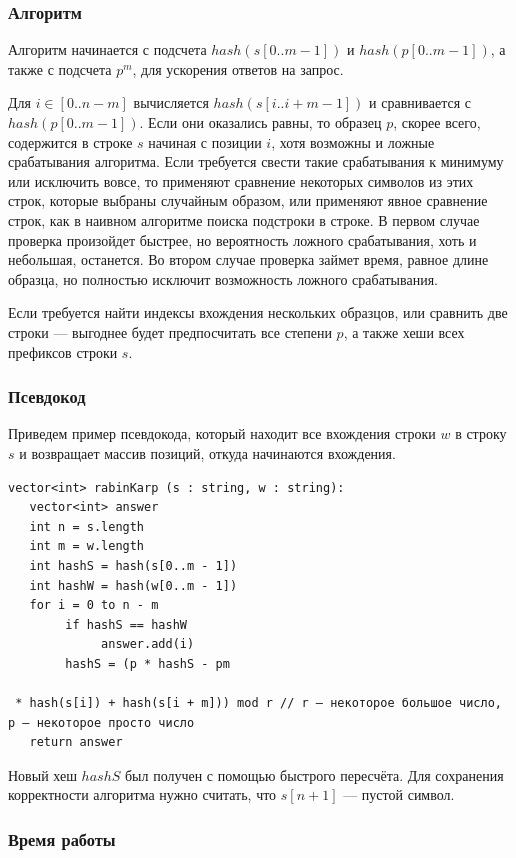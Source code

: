 \subsubsection{Алгоритм}

Алгоритм начинается с подсчета $hash(s[0..m-1])$ и $hash(p[0..m-1])$, а также с подсчета $p^m$, для ускорения ответов на запрос.

Для $i \in [0..n-m]$ вычисляется $hash(s[i..i+m-1])$ и сравнивается с $hash(p[0..m-1])$.
Если они оказались равны, то образец $p$, скорее всего, содержится в строке $s$ начиная с позиции $i$, хотя возможны и ложные срабатывания алгоритма.
Если требуется свести такие срабатывания к минимуму или исключить вовсе, то применяют сравнение некоторых символов из этих строк, которые выбраны случайным образом, или применяют явное сравнение строк, как в наивном алгоритме поиска подстроки в строке.
В первом случае проверка произойдет быстрее, но вероятность ложного срабатывания, хоть и небольшая, останется.
Во втором случае проверка займет время, равное длине образца, но полностью исключит возможность ложного срабатывания.

Если требуется найти индексы вхождения нескольких образцов, или сравнить две строки --- выгоднее будет предпосчитать все степени $p$, а также хеши всех префиксов строки $s$.

\subsubsection{Псевдокод}

Приведем пример псевдокода, который находит все вхождения строки $w$ в строку $s$ и возвращает массив позиций, откуда начинаются вхождения.

\begin{verbatim}
vector<int> rabinKarp (s : string, w : string):
   vector<int> answer
   int n = s.length
   int m = w.length
   int hashS = hash(s[0..m - 1])
   int hashW = hash(w[0..m - 1])
   for i = 0 to n - m
        if hashS == hashW
             answer.add(i)
        hashS = (p * hashS - pm

 * hash(s[i]) + hash(s[i + m])) mod r // r — некоторое большое число, p — некоторое просто число
   return answer
\end{verbatim}

Новый хеш $hashS$ был получен с помощью быстрого пересчёта.
Для сохранения корректности алгоритма нужно считать, что $s[n+1]$ --- пустой символ.

\subsubsection{Время работы}

